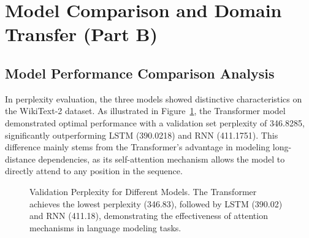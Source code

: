 \documentclass[12pt,oneside]{article}
\begin{document}
\section{Model Comparison and Domain Transfer (Part B)}

\subsection{Model Performance Comparison Analysis}

In perplexity evaluation, the three models showed distinctive characteristics on the WikiText-2 dataset. As illustrated in Figure~\ref{fig:perplexity}, the Transformer model demonstrated optimal performance with a validation set perplexity of 346.8285, significantly outperforming LSTM (390.0218) and RNN (411.1751). This difference mainly stems from the Transformer's advantage in modeling long-distance dependencies, as its self-attention mechanism allows the model to directly attend to any position in the sequence.

\begin{figure}[!htb]
    \centering
    \caption{Validation Perplexity for Different Models. The Transformer achieves the lowest perplexity (346.83), followed by LSTM (390.02) and RNN (411.18), demonstrating the effectiveness of attention mechanisms in language modeling tasks.}
    \label{fig:perplexity}
\end{figure}
\end{document}
